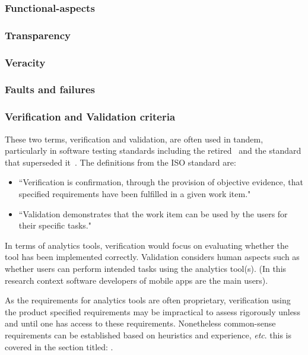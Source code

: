 \subsubsection{Functional-aspects}

\subsubsection{Transparency}

\subsubsection{Veracity}

\subsubsection{Faults and failures}


\subsubsection{Verification and Validation criteria}
These two terms, verification and validation, are often used in tandem, particularly in software testing standards including the retired~\cite{BS_7925_1_1998} and the standard that superseded it~\cite{iso29119-1-2013}. The definitions from the ISO standard are:
\begin{itemize}
    \item ``Verification is confirmation, through the provision of objective evidence, that specified requirements have been fulfilled in a given work item."~\cite{iso29119-1-2013}
    \item ``Validation demonstrates that the work item can be used by the users for their specific tasks."~\cite{iso29119-1-2013}
\end{itemize}

In terms of analytics tools, verification would focus on evaluating whether the tool has been implemented correctly. Validation considers human aspects such as whether users can perform intended tasks using the analytics tool(s). (In this research context software developers of mobile apps are the main users).

As the requirements for analytics tools are often proprietary, verification using the product specified requirements may be impractical to assess rigorously unless and until one has access to these requirements. Nonetheless common-sense requirements can be established based on heuristics and experience, \emph{etc}. this is covered in the section titled: \href{rubric-for-evaluating-analytics-tools}{}.


